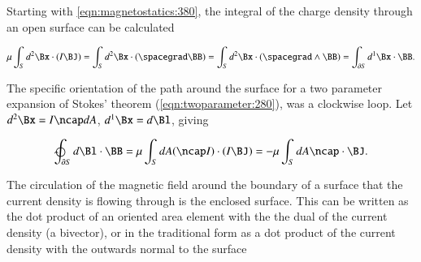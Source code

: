 


Starting with
\cref{eqn:magnetostatics:380}, the
integral of the
charge density through an open surface can be calculated

\begin{dmath}\label{eqn:magnetostatics_enclosedCurrent:720}
\mu \int_S d^2 \Bx \cdot (I \BJ)
=
\int_S d^2 \Bx \cdot (\spacegrad \BB)
=
\int_S d^2 \Bx \cdot (\spacegrad \wedge \BB)
=
\int_{\partial S} d^1 \Bx \cdot \BB.
\end{dmath}

The specific orientation of the path around the surface for a two parameter expansion of Stokes' theorem (\cref{eqn:twoparameter:280}), was a clockwise loop.
Let
\( d^2 \Bx = I \ncap dA \), \( d^1 \Bx = d\Bl \), giving

\begin{dmath}\label{eqn:magnetostatics_enclosedCurrent:740}
\ointclockwise_{\partial S} d\Bl \cdot \BB
= \mu \int_S dA (\ncap I) \cdot (I \BJ)
= -\mu \int_S dA \ncap \cdot \BJ.
\end{dmath}

The circulation of the magnetic field around the boundary of a surface that the current density is flowing through is the enclosed surface.
This can be written as the dot product of an oriented area element with the the dual of the current density (a bivector), or in the traditional form as a dot product of the current density with the outwards normal to the surface



